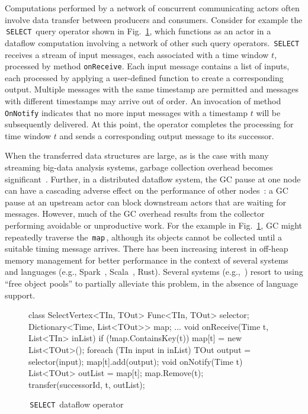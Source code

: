 \documentclass[a4paper,UKenglish]{lipics-v2018}
\newcommand{\C}[1]{\code{#1}}
\newcommand{\code}[1]{\,{\tt #1}\,}
\begin{document}
Computations performed by a network of concurrent communicating actors
often involve data transfer between producers and consumers. Consider
for example the \C{SELECT} query operator shown in
Fig.~\ref{fig:motivating-eg}, which functions as an actor in a
dataflow computation involving a network of other such query
operators. \C{SELECT} receives a stream of input messages, each
associated with a time window $t$, processed by method
\texttt{onReceive}.  Each input message contains a list of inputs,
each processed by applying a user-defined function to create a
corresponding output.  Multiple messages with the same timestamp are
permitted and messages with different timestamps may arrive out of
order.  An invocation of method \texttt{OnNotify} indicates that no
more input messages with a timestamp $t$ will be subsequently
delivered.  At this point, the operator completes the processing for
time window $t$ and sends a corresponding output message to its
successor.

When the transferred data structures are large, as is the case with many
streaming big-data analysis systems, garbage collection overhead becomes
significant~\cite{Broom:HotOS}.  Further, in a distributed
dataflow system, the GC pause at one node can have a cascading adverse
effect on the performance of other nodes~\cite{Broom:HotOS,harris15}:
a GC pause at an upstream actor can block downstream actors that are waiting for
messages.  However, much of the GC overhead results from the
collector performing avoidable or unproductive work.  For the example
in Fig.~\ref{fig:motivating-eg}, GC might repeatedly traverse the
\C{map}, although its objects cannot be collected until a
suitable timing message arrives.
There has been increasing interest in off-heap memory management for better performance
in the context of several  systems and languages (e.g.,
Spark~\cite{SPARK:2015}, Scala~\cite{ScalaOffHeap}, Rust).
Several systems (e.g.,~\cite{TRILL:2014}) resort to using ``free object pools'' to partially alleviate this problem, in
the absence of language support.

\begin{figure}[t!]
\begin{numcodejava}
class SelectVertex<TIn, TOut> {
  Func<TIn, TOut> selector;
  Dictionary<Time, List<TOut>> map;
  ...
  void onReceive(Time t, List<TIn> inList) {
    if (!map.ContainsKey(t)) map[t] = new List<TOut>();
    foreach (TIn input in inList) {
      TOut output = selector(input);
      map[t].add(output); } }
  void onNotify(Time t) {
     List<TOut> outList = map[t];
     map.Remove(t);
     transfer(successorId, t, outList); }
}
\end{numcodejava}
\caption{\C{SELECT} dataflow operator}
\label{fig:motivating-eg}
\vspace*{-0.2in}
\end{figure}
\end{document}
